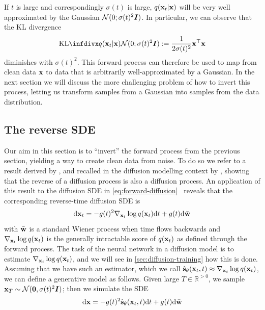 If $t$ is large and correspondingly $\sigma(t)$ is large, $q({\mathbf{x}}_t|{\mathbf{x}})$ will be very well approximated by the Gaussian ${\mathcal{N}}(0; \sigma(t)^2{\bm{I}})$. In particular, we can observe that the KL divergence
\begin{equation}
    \kl{q(\rvx_t|\rvx)}{\gN(0; \sigma(t)^2\mI)} :=\frac{1}{2\sigma(t)^2} \rvx^\top \rvx
\end{equation}
diminishes with $\sigma(t)^2$. This forward process can therefore be used to map from clean data ${\mathbf{x}}$ to data that is arbitrarily well-approximated by a Gaussian. In the next section we will discuss the more challenging problem of how to invert this process, letting us transform samples from a Gaussian into samples from the data distribution.

\subsection{The reverse SDE} \label{sec:diffusion-reverse-sde}
Our aim in this section is to ``invert'' the forward process from the previous section, yielding a way to create clean data from noise. To do so we refer to a result  derived by \citet{anderson1982reverse}, and recalled in the diffusion modelling context by \citet{song2020score}, showing that the reverse of a diffusion process is also a diffusion process. An application of this result to the diffusion SDE in \cref{eq:forward-diffusion}~\citep{song2020score} reveals that the corresponding reverse-time diffusion SDE is
\begin{equation} \label{eq:reverse-diffusion}
    \mathrm{d}{\mathbf{x}}_t = -g(t)^2 \nabla_{{\mathbf{x}}_t} \log q({\mathbf{x}}_t) \mathrm{d}t + g(t) \mathrm{d}\bar{{\mathbf{w}}}
\end{equation}
with $\bar{{\mathbf{w}}}$ is a standard Wiener process when time flows backwards and $\nabla_{{\mathbf{x}}_t} \log q({\mathbf{x}}_t)$ is the generally intractable score of $q({\mathbf{x}}_t)$ as defined through the forward process. The task of the neural network in a diffusion model is to estimate $\nabla_{{\mathbf{x}}_t} \log q({\mathbf{x}}_t)$, and we will see in \cref{sec:diffusion-training} how this is done. Assuming that we have such an estimator, which we call $\hat{{\mathbf{s}}}_\theta({\mathbf{x}}_t, t) \approx \nabla_{{\mathbf{x}}_t} \log q({\mathbf{x}}_t)$, we can define a generative model as follows. Given large $T \in \mathbb{R}^{>0}$, we sample ${\mathbf{x}}_T \sim {\mathcal{N}}({\bm{0}}, \sigma(t)^2 {\bm{I}})$; then we simulate the SDE
\begin{equation} \label{eq:reverse-diffusion-with-nn}
    \mathrm{d}{\mathbf{x}} = -g(t)^2 \hat{{\mathbf{s}}}_\theta({\mathbf{x}}_t, t) \mathrm{d}t + g(t) \mathrm{d}\bar{{\mathbf{w}}}
\end{equation}
